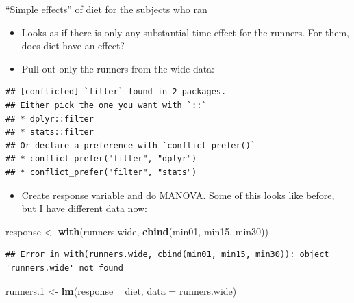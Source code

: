 \documentclass[ignorenonframetext,]{beamer}
\newenvironment{Shaded}{\begin{snugshade}}{\end{snugshade}}
\newcommand{\DataTypeTok}[1]{\textcolor[rgb]{0.13,0.29,0.53}{#1}}
\newcommand{\FloatTok}[1]{\textcolor[rgb]{0.00,0.00,0.81}{#1}}
\newcommand{\KeywordTok}[1]{\textcolor[rgb]{0.13,0.29,0.53}{\textbf{#1}}}
\newcommand{\NormalTok}[1]{#1}
\newcommand{\OperatorTok}[1]{\textcolor[rgb]{0.81,0.36,0.00}{\textbf{#1}}}
\newcommand{\StringTok}[1]{\textcolor[rgb]{0.31,0.60,0.02}{#1}}
\providecommand{\tightlist}{%
  \setlength{\itemsep}{0pt}\setlength{\parskip}{0pt}}
\begin{document}
\begin{frame}[fragile]{``Simple effects'' of diet for the subjects who
ran}
\protect\hypertarget{simple-effects-of-diet-for-the-subjects-who-ran}{}

\begin{itemize}
\item
  Looks as if there is only any substantial time effect for the runners.
  For them, does diet have an effect?
\item
  Pull out only the runners from the wide data:
\end{itemize}

\begin{Shaded}
\end{Shaded}

\begin{verbatim}
## [conflicted] `filter` found in 2 packages.
## Either pick the one you want with `::` 
## * dplyr::filter
## * stats::filter
## Or declare a preference with `conflict_prefer()`
## * conflict_prefer("filter", "dplyr")
## * conflict_prefer("filter", "stats")
\end{verbatim}

\begin{itemize}
\tightlist
\item
  Create response variable and do MANOVA. Some of this looks like
  before, but I have different data now:
\end{itemize}

\begin{Shaded}
\begin{Highlighting}[]
\NormalTok{response <-}\StringTok{ }\KeywordTok{with}\NormalTok{(runners.wide, }\KeywordTok{cbind}\NormalTok{(min01, min15, min30))}
\end{Highlighting}
\end{Shaded}

\begin{verbatim}
## Error in with(runners.wide, cbind(min01, min15, min30)): object 'runners.wide' not found
\end{verbatim}

\begin{Shaded}
\begin{Highlighting}[]
\NormalTok{runners}\FloatTok{.1}\NormalTok{ <-}\StringTok{ }\KeywordTok{lm}\NormalTok{(response }\OperatorTok{~}\StringTok{ }\NormalTok{diet, }\DataTypeTok{data =}\NormalTok{ runners.wide)}
\end{Highlighting}
\end{Shaded}


\end{frame}
\end{document}
